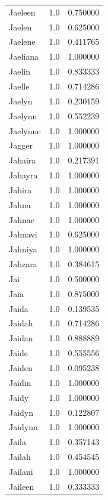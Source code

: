 \documentclass[
  letterpaper,
  DIV=11,
  numbers=noendperiod]{scrreprt}
\begin{document}
\begin{tabular}{lrr}
Jaeleen         &   1.0 &   0.750000 \\
Jaelen          &   1.0 &   0.625000 \\
Jaelene         &   1.0 &   0.411765 \\
Jaeliana        &   1.0 &   1.000000 \\
Jaelin          &   1.0 &   0.833333 \\
Jaelle          &   1.0 &   0.714286 \\
Jaelyn          &   1.0 &   0.230159 \\
Jaelynn         &   1.0 &   0.552239 \\
Jaelynne        &   1.0 &   1.000000 \\
Jagger          &   1.0 &   1.000000 \\
Jahaira         &   1.0 &   0.217391 \\
Jahayra         &   1.0 &   1.000000 \\
Jahira          &   1.0 &   1.000000 \\
Jahna           &   1.0 &   1.000000 \\
Jahnae          &   1.0 &   1.000000 \\
Jahnavi         &   1.0 &   0.625000 \\
Jahniya         &   1.0 &   1.000000 \\
Jahzara         &   1.0 &   0.384615 \\
Jai             &   1.0 &   0.500000 \\
Jaia            &   1.0 &   0.875000 \\
Jaida           &   1.0 &   0.139535 \\
Jaidah          &   1.0 &   0.714286 \\
Jaidan          &   1.0 &   0.888889 \\
Jaide           &   1.0 &   0.555556 \\
Jaiden          &   1.0 &   0.095238 \\
Jaidin          &   1.0 &   1.000000 \\
Jaidy           &   1.0 &   1.000000 \\
Jaidyn          &   1.0 &   0.122807 \\
Jaidynn         &   1.0 &   1.000000 \\
Jaila           &   1.0 &   0.357143 \\
Jailah          &   1.0 &   0.454545 \\
Jailani         &   1.0 &   1.000000 \\
Jaileen         &   1.0 &   0.333333 \\

\end{tabular}
\end{document}
